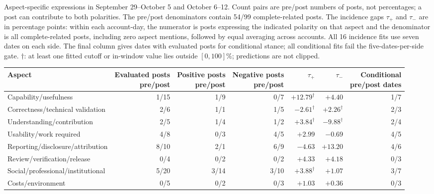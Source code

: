 \caption{Aspect-specific expressions in September 29--October 5 and October 6--12. Count pairs are pre/post numbers of posts, not percentages; a post can contribute to both polarities. The pre/post denominators contain 54/99 complete-related posts. The incidence gaps $\tau_+$ and $\tau_-$ are in percentage points: within each account-day, the numerator is posts expressing the indicated polarity on that aspect and the denominator is all complete-related posts, including zero aspect mentions, followed by equal averaging across accounts. All 16 incidence fits use seven dates on each side. The final column gives dates with evaluated posts for conditional stance; all conditional fits fail the five-dates-per-side gate. $\dagger$: at least one fitted cutoff or in-window value lies outside $[0,100]\%$; predictions are not clipped.}
\label{tab:rq4aspects}
\centering
\begin{tabular*}{\textwidth}{@{\extracolsep{\fill}}lrrrrrr@{}}
\toprule Aspect & \shortstack{Evaluated posts\\pre/post} & \shortstack{Positive posts\\pre/post} & \shortstack{Negative posts\\pre/post} & $\tau_+$ & $\tau_-$ & \shortstack{Conditional\\pre/post dates}\\
\midrule
Capability/usefulness & 1/15 & 1/9 & 0/7 & $+12.79^{\dagger}$ & $+4.40$ & 1/7\\
Correctness/technical validation & 2/6 & 1/1 & 1/5 & $-2.61^{\dagger}$ & $+2.26^{\dagger}$ & 2/3\\
Understanding/contribution & 2/5 & 1/4 & 1/2 & $+3.84^{\dagger}$ & $-9.88^{\dagger}$ & 2/4\\
Usability/work required & 4/8 & 0/3 & 4/5 & $+2.99$ & $-0.69$ & 4/5\\
Reporting/disclosure/attribution & 8/10 & 2/1 & 6/9 & $-4.63$ & $+13.20$ & 4/6\\
Review/verification/release & 0/4 & 0/2 & 0/2 & $+4.33$ & $+4.18$ & 0/3\\
Social/professional/institutional & 5/20 & 3/14 & 3/10 & $+3.88^{\dagger}$ & $+1.07$ & 3/7\\
Costs/environment & 0/5 & 0/2 & 0/3 & $+1.03$ & $+0.36$ & 0/3\\
\bottomrule
\end{tabular*}
